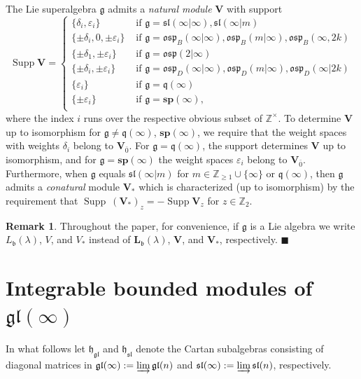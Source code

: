 \documentclass[12pt]{amsart}
\newcommand\Z{\mathbb{Z}}
\newcommand\g{\mathfrak{g}}
\newcommand\fq{\mathfrak{q}}
\newcommand\fh{\mathfrak{h}}
\newcommand\fb{\mathfrak{b}}
\newcommand\fsl{\mathfrak{sl}}
\newcommand\fosp{\mathfrak{osp}}
\newcommand\fgl{\mathfrak{gl}}
\newcommand\bV{\mathbf{V}}
\newcommand\bsp{\mathbf{sp}}
\newcommand\bL{\mathbf{L}}
\DeclareMathOperator{\Supp}{Supp} %
\theoremstyle{plain}
\theoremstyle{definition}
\newtheorem{rem}[theo]{Remark}
\numberwithin{equation}{section}
\newcommand\xqed[1]{%
  \leavevmode\unskip\penalty9999 \hbox{}\nobreak\hfill
  \quad\hbox{#1}}
\newcommand\demo{\xqed{$\blacksquare$}}
\begin{document}
The Lie superalgebra $\g$ admits a \emph{natural module} $\bV$ with support
	\[ 
\Supp \bV = \begin{cases} 
	\{\delta_i, \varepsilon_i\} & \text{ if } \g = \fsl(\infty | \infty), \fsl(\infty | m) \\
\{\pm \delta_i, 0, \pm \varepsilon_i\} & \text{ if } \g=\fosp_B(\infty|\infty), \fosp_B(m|\infty), \fosp_B(\infty, 2k) \\
\{\pm \delta_1, \pm \varepsilon_i\} & \text{ if } \g=\fosp(2|\infty) \\
\{\pm \delta_i, \pm \varepsilon_i\} & \text{ if } \g=\fosp_D(\infty|\infty), \fosp_D(m|\infty), \fosp_D(\infty|2k) \\
      \{\varepsilon_i\} & \text{ if } \g=\fq(\infty) \\
\{\pm \varepsilon_i\} & \text{ if } \g=\bsp(\infty), \\
  \end{cases}
	\]
where the index $i$ runs over the respective obvious subset of $\Z^\times $. To determine $\bV$ up to isomorphism for $\g\neq \fq(\infty)$, $\bsp(\infty)$, we require that the weight spaces with weights $\delta_i$ belong to $\bV_{\bar 0}$. For $\g = \fq(\infty)$, the support determines $\bV$ up to isomorphism, and for $\g = \bsp(\infty)$ the weight spaces $\varepsilon_i$ belong to $\bV_{\bar 0}$. Furthermore, when $\g$ equals $\fsl(\infty | m)$ for $m\in \Z_{\geq 1}\cup \{\infty\}$ or $\fq(\infty)$, then $\g$ admits a \emph{conatural} module $\bV_*$ which is characterized (up to isomorphism) by the requirement that $\Supp \ (\bV_*)_z = -\Supp \bV_z$ for $z\in \Z_{2}$.

\begin{rem}
Throughout the paper, for convenience, if $\g$ is a Lie algebra we write $L_\fb(\lambda)$, $V$, and $V_*$ instead of $\bL_\fb(\lambda)$, $\bV$, and $\bV_*$, respectively.
\demo
\end{rem}



\section{Integrable bounded modules of $\fgl(\infty)$}\label{sec:int.bound.gl}

In what follows let $\fh_\fgl$ and $\fh_\fsl$ denote the Cartan subalgebras consisting of diagonal matrices in $\fgl(\infty) := \varinjlim \fgl(n)$ and $\fsl(\infty) := \varinjlim \fsl(n)$, respectively.
\end{document}

